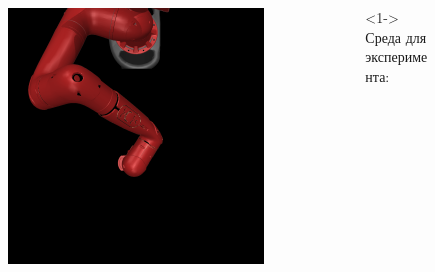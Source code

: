 \begin{frame}
\begin{columns}[t]
\begin{column}{0.33\linewidth}
\begin{itemize}
\begin{figure}
            \begin{subfigure}{0.8\linewidth}
                \centering
                  \includegraphics[width=\linewidth]{images/env/rotated_drawer/masked_robot.png}
            \end{subfigure}
            \end{figure}
    \end{itemize}
\end{column}
\hfill
\begin{column}{0.63\linewidth}<1->
    Среда для эксперимента:
    \begin{figure}
\end{figure}
\end{column}
\end{columns}
\end{frame}
